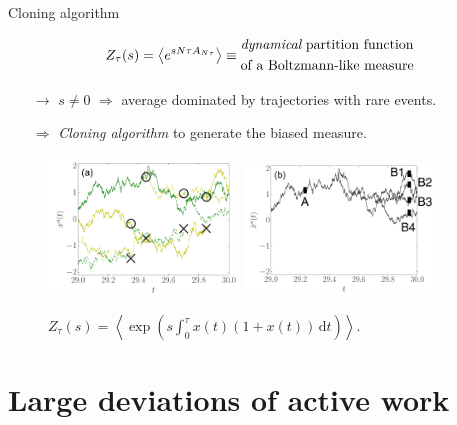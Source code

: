 \documentclass{beamer}
\begin{document}
\begin{frame}{Cloning algorithm}

\vspace{-10pt}
\begin{align*}
Z_{\tau}(s) = \left<e^{s N \tau A_{N\tau}}\right> \equiv \begin{split}&\text{{\it dynamical} partition function}\\ &\text{of a Boltzmann-like measure}\end{split}
\end{align*}
\begin{itemize}
  \item[$\rightarrow$] $s \neq 0$ $\Rightarrow$ average dominated by trajectories with rare events.
\end{itemize}

\pause
\begin{itemize}
  \item[$\Rightarrow$] \textit{Cloning algorithm} to generate the biased measure.
\end{itemize}

\begin{figure}
\centering
\includegraphics[width=0.45\textwidth]{Nemoto_2016_fig1a.png}
\includegraphics[width=0.45\textwidth]{Nemoto_2016_fig1b.png}
\caption{$Z_{\tau}(s) = \left<\exp\left(s \int_0^{\tau} x(t)(1 + x(t)) \, \text{d}t\right)\right>$. }
\end{figure}

\end{frame}

\section{Large deviations of active work}
\end{document}
